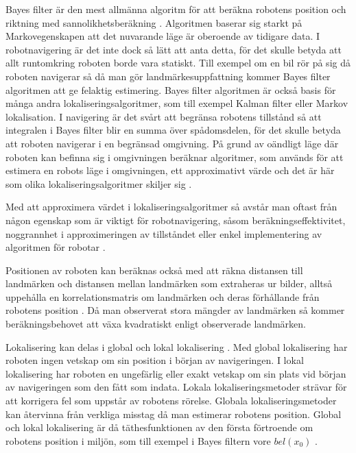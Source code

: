 Bayes filter är den mest allmänna algoritm för att beräkna robotens position och riktning med sannolikhetsberäkning \citep{ProbabilisticRobotics}. Algoritmen baserar sig starkt på Markovegenskapen att det nuvarande läge är oberoende av tidigare data. I robotnavigering är det inte dock så lätt att anta detta, för det skulle betyda att allt runtomkring roboten borde vara statiskt. Till exempel om en bil rör på sig då roboten navigerar så då man gör landmärkesuppfattning kommer Bayes filter algoritmen att ge felaktig estimering. Bayes filter algoritmen är också basis för många andra lokaliseringsalgoritmer, som till exempel Kalman filter eller Markov lokalisation. I navigering är det svårt att begränsa robotens tillstånd så att integralen i Bayes filter blir en summa över spådomsdelen, för det skulle betyda att roboten navigerar i en begränsad omgivning. På grund av oändligt läge där roboten kan befinna sig i omgivningen beräknar algoritmer, som används för att estimera en robots läge i omgivningen, ett approximativt värde och det är här som olika lokaliseringsalgoritmer skiljer sig \citep{ProbabilisticRobotics}.

Med att approximera värdet i lokaliseringsalgoritmer så avstår man oftast från någon egenskap som är viktigt för robotnavigering, såsom beräkningseffektivitet, noggrannhet i approximeringen av tillståndet eller enkel implementering av algoritmen för robotar \citep{ProbabilisticRobotics}. 

Positionen av roboten kan beräknas också med att räkna distansen till landmärken och distansen mellan landmärken som extraheras ur bilder, alltså uppehålla en korrelationsmatris om landmärken och deras förhållande från robotens position \citep{realslamproblem, ProbabilisticRobotics}. Då man observerat stora mängder av landmärken så kommer beräkningsbehovet att växa kvadratiskt enligt observerade landmärken. 

Lokalisering kan delas i global och lokal lokalisering \citep{982903, globalsubmaps}. Med global lokalisering har roboten ingen vetskap om sin position i början av navigeringen. I lokal lokalisering har roboten en ungefärlig eller exakt vetskap om sin plats vid början av navigeringen som den fått som indata. Lokala lokaliseringsmetoder strävar för att korrigera fel som uppstår av robotens rörelse. Globala lokaliseringsmetoder kan återvinna från verkliga misstag då man estimerar robotens position. Global och lokal lokalisering är då täthesfunktionen av den första förtroende om robotens position i miljön, som till exempel i Bayes filtern vore $bel(x_0)$ \citep{ProbabilisticRobotics}.

